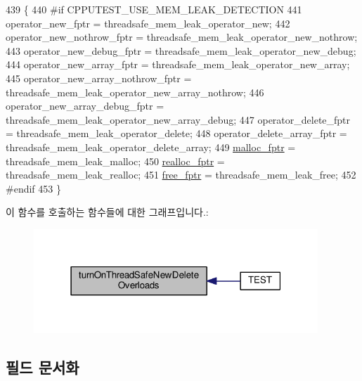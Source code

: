 \begin{DoxyCode}
439 \{
440 \textcolor{preprocessor}{#if CPPUTEST\_USE\_MEM\_LEAK\_DETECTION}
441     operator\_new\_fptr = threadsafe\_mem\_leak\_operator\_new;
442     operator\_new\_nothrow\_fptr = threadsafe\_mem\_leak\_operator\_new\_nothrow;
443     operator\_new\_debug\_fptr = threadsafe\_mem\_leak\_operator\_new\_debug;
444     operator\_new\_array\_fptr = threadsafe\_mem\_leak\_operator\_new\_array;
445     operator\_new\_array\_nothrow\_fptr = threadsafe\_mem\_leak\_operator\_new\_array\_nothrow;
446     operator\_new\_array\_debug\_fptr = threadsafe\_mem\_leak\_operator\_new\_array\_debug;
447     operator\_delete\_fptr = threadsafe\_mem\_leak\_operator\_delete;
448     operator\_delete\_array\_fptr = threadsafe\_mem\_leak\_operator\_delete\_array;
449     \hyperlink{_memory_leak_warning_plugin_8cpp_a8d005fdb88aed6453d5f26d35acb705d}{malloc\_fptr} = threadsafe\_mem\_leak\_malloc;
450     \hyperlink{_memory_leak_warning_plugin_8cpp_a0fd37df1d2f3e1064e6cd2ca5acf2297}{realloc\_fptr} = threadsafe\_mem\_leak\_realloc;
451     \hyperlink{_memory_leak_warning_plugin_8cpp_a11b58fefb96bd7e1547b86cd961ceb41}{free\_fptr} = threadsafe\_mem\_leak\_free;
452 \textcolor{preprocessor}{#endif}
453 \}
\end{DoxyCode}


이 함수를 호출하는 함수들에 대한 그래프입니다.\+:
\nopagebreak
\begin{figure}[H]
\begin{center}
\leavevmode
\includegraphics[width=303pt]{class_memory_leak_warning_plugin_a0559f29cb452d6bb4a58c9730e2c6cf2_icgraph}
\end{center}
\end{figure}




\subsection{필드 문서화}
